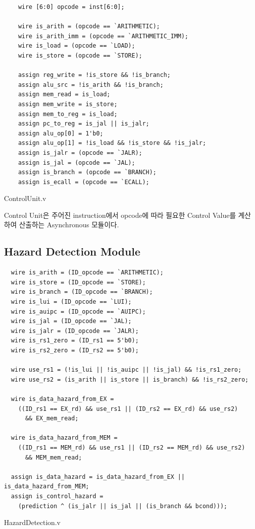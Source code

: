 \documentclass[openright, a4paper]{article}
\newenvironment{longlisting}{\captionsetup{type=listing}}{}
\begin{document}
\begin{longlisting}
    \begin{verbatim}
    wire [6:0] opcode = inst[6:0];

    wire is_arith = (opcode == `ARITHMETIC);
    wire is_arith_imm = (opcode == `ARITHMETIC_IMM);
    wire is_load = (opcode == `LOAD);
    wire is_store = (opcode == `STORE);

    assign reg_write = !is_store && !is_branch;
    assign alu_src = !is_arith && !is_branch;
    assign mem_read = is_load;
    assign mem_write = is_store;
    assign mem_to_reg = is_load;
    assign pc_to_reg = is_jal || is_jalr;
    assign alu_op[0] = 1'b0;
    assign alu_op[1] = !is_load && !is_store && !is_jalr;
    assign is_jalr = (opcode == `JALR);
    assign is_jal = (opcode == `JAL);
    assign is_branch = (opcode == `BRANCH);
    assign is_ecall = (opcode == `ECALL);
    \end{verbatim}
    \caption{ControlUnit.v}
\end{longlisting}

Control Unit은 주어진 instruction에서 opcode에 따라 필요한 Control Value를 계산하여 산출하는 Asynchronous 모듈이다. \\

\subsection{Hazard Detection Module}

\begin{longlisting}
\begin{verbatim}
  wire is_arith = (ID_opcode == `ARITHMETIC);
  wire is_store = (ID_opcode == `STORE);
  wire is_branch = (ID_opcode == `BRANCH);
  wire is_lui = (ID_opcode == `LUI);
  wire is_auipc = (ID_opcode == `AUIPC);
  wire is_jal = (ID_opcode == `JAL);
  wire is_jalr = (ID_opcode == `JALR);
  wire is_rs1_zero = (ID_rs1 == 5'b0);
  wire is_rs2_zero = (ID_rs2 == 5'b0);

  wire use_rs1 = (!is_lui || !is_auipc || !is_jal) && !is_rs1_zero;
  wire use_rs2 = (is_arith || is_store || is_branch) && !is_rs2_zero;

  wire is_data_hazard_from_EX = 
    ((ID_rs1 == EX_rd) && use_rs1 || (ID_rs2 == EX_rd) && use_rs2) 
      && EX_mem_read;

  wire is_data_hazard_from_MEM = 
    ((ID_rs1 == MEM_rd) && use_rs1 || (ID_rs2 == MEM_rd) && use_rs2)
      && MEM_mem_read;
  
  assign is_data_hazard = is_data_hazard_from_EX || is_data_hazard_from_MEM;
  assign is_control_hazard = 
    (prediction ^ (is_jalr || is_jal || (is_branch && bcond)));
\end{verbatim}
\caption{HazardDetection.v}
\end{longlisting}
\end{document}
